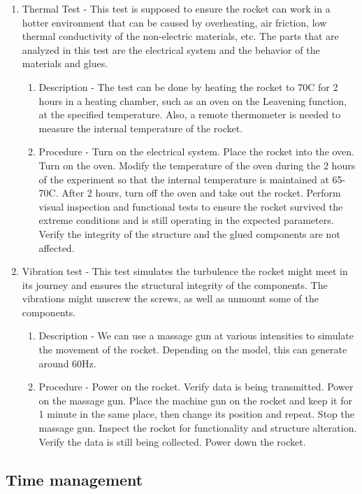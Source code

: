 \begin{enumerate}
\begin{enumerate}
    \end{enumerate}
\item Thermal Test
    - This test is supposed to ensure the rocket can work in a hotter environment that can be caused by overheating, air friction, low thermal conductivity of the non-electric materials, etc. The parts that are analyzed in this test are the electrical system and the behavior of the materials and glues. 
    \begin{enumerate}
        \item Description - The test can be done by heating the rocket to 70C for 2 hours in a heating chamber, such as an oven on the Leavening function, at the specified temperature. Also, a remote thermometer is needed to measure the internal temperature of the rocket.
        \item Procedure - Turn on the electrical system. Place the rocket into the oven. Turn on the oven. Modify the temperature of the oven during the 2 hours of the experiment so that the internal temperature is maintained at 65-70C. After 2 hours, turn off the oven and take out the rocket. Perform visual inspection and functional tests to ensure the rocket survived the extreme conditions and is still operating in the expected parameters. Verify the integrity of the structure and the glued components are not affected. 
    \end{enumerate}
\item Vibration test
    - This test simulates the turbulence the rocket might meet in its journey and ensures the structural integrity of the components. The vibrations might unscrew the screws, as well as unmount some of the components.
    \begin{enumerate}
        \item Description - We can use a massage gun at various intensities to simulate the movement of the rocket. Depending on the model, this can generate around 60Hz.
        \item Procedure - Power on the rocket. Verify data is being transmitted. Power on the massage gun. Place the machine gun on the rocket and keep it for 1 minute in the same place, then change its position and repeat. Stop the massage gun. Inspect the rocket for functionality and structure alteration. Verify the data is still being collected. Power down the rocket.
    \end{enumerate}

\end{enumerate}

\subsection{Time management}

